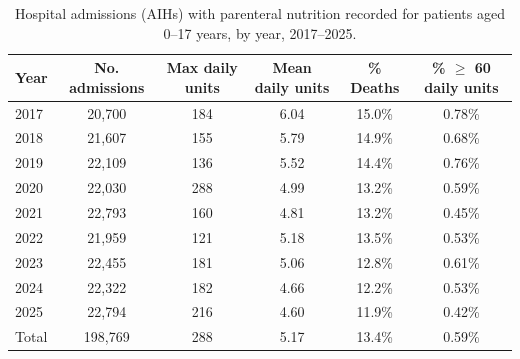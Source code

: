 \documentclass[pdflatex,sn-mathphys-num]{sn-jnl}
\theoremstyle{thmstyleone}%
\theoremstyle{thmstyletwo}%
\theoremstyle{thmstylethree}%
\begin{document}
\begin{table}[ht]
    \centering
    \caption{Hospital admissions (AIHs) with parenteral nutrition recorded for patients aged 0--17 years, by year, 2017--2025.}
    \label{tab:pn_17anos}
    {\small
    \setlength{\tabcolsep}{3pt}
    \begin{tabular}{@{}lccccc@{}}
        \hline
        Year & No. admissions & Max daily units & Mean daily units & \% Deaths & \% $\geq$ 60 daily units \\
        \hline
        2017 & 20,700 & 184 & 6.04 & 15.0\% & 0.78\% \\
        2018 & 21,607 & 155 & 5.79 & 14.9\% & 0.68\% \\
        2019 & 22,109 & 136 & 5.52 & 14.4\% & 0.76\% \\
        2020 & 22,030 & 288 & 4.99 & 13.2\% & 0.59\% \\
        2021 & 22,793 & 160 & 4.81 & 13.2\% & 0.45\% \\
        2022 & 21,959 & 121 & 5.18 & 13.5\% & 0.53\% \\
        2023 & 22,455 & 181 & 5.06 & 12.8\% & 0.61\% \\
        2024 & 22,322 & 182 & 4.66 & 12.2\% & 0.53\% \\
        2025 & 22,794 & 216 & 4.60 & 11.9\% & 0.42\% \\
        \hline
        Total & 198,769 & 288 & 5.17 & 13.4\% & 0.59\% \\
        \hline
    \end{tabular}}
\end{table}
\end{document}
